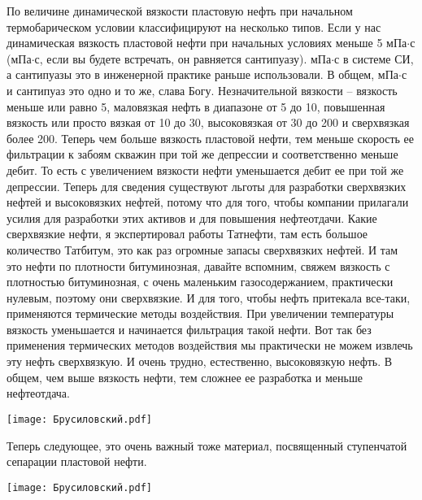 \documentclass[main.tex]{subfiles}
\begin{document}
По величине динамической вязкости пластовую нефть при начальном термобарическом условии классифицируют на несколько типов.
Если у нас динамическая вязкость пластовой нефти при начальных условиях меньше 5 мПа$\cdot$с (мПа$\cdot$с, если вы будете встречать, он равняется сантипуазу).
мПа$\cdot$с в системе СИ, а сантипуазы это в инженерной практике раньше использовали.
В общем, мПа$\cdot$с и сантипуаз это одно и то же, слава Богу.
Незначительной вязкости -- вязкость меньше или равно 5, маловязкая нефть в диапазоне от 5 до 10, повышенная вязкость или просто вязкая от 10 до
30, высоковязкая от 30 до 200 и сверхвязкая более 200.
Теперь чем больше вязкость пластовой нефти, тем меньше скорость ее фильтрации к забоям скважин при той же депрессии и соответственно меньше дебит.
То есть с увеличением вязкости нефти уменьшается дебит ее при той же депрессии.
Теперь для сведения существуют льготы для разработки сверхвязких нефтей и высоковязких нефтей, потому что для того, чтобы компании прилагали усилия для разработки этих активов и для повышения нефтеотдачи.
Какие сверхвязкие нефти, я экспертировал работы Татнефти, там есть большое количество Татбитум, это как раз огромные запасы сверхвязких нефтей.
И там это нефти по плотности битуминозная, давайте вспомним, свяжем вязкость с плотностью битуминозная, с очень маленьким газосодержанием, практически нулевым, поэтому они сверхвязкие.
И для того, чтобы нефть притекала все-таки, применяются термические методы воздействия.
При увеличении температуры вязкость уменьшается и начинается фильтрация такой нефти.
Вот так без применения термических методов воздействия мы практически не можем извлечь эту нефть сверхвязкую.
И очень трудно, естественно, высоковязкую нефть.
В общем, чем выше вязкость нефти, тем сложнее ее разработка и меньше нефтеотдача.

\begin{center}
\texttt{[image: Брусиловский.pdf]}
\end{center}

Теперь следующее, это очень важный тоже материал, посвященный ступенчатой сепарации пластовой нефти.

\begin{center}
\texttt{[image: Брусиловский.pdf]}
\end{center}
\end{document}
